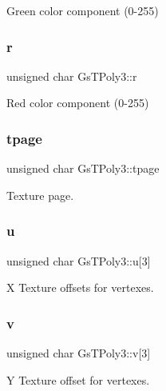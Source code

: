 Green color component (0-\/255) 

\mbox{\label{structGsTPoly3_a377534efc910699a7515c773ce93ba3e}} 
\subsubsection{\texorpdfstring{r}{r}}
{\footnotesize\ttfamily unsigned char Gs\+T\+Poly3\+::r}



Red color component (0-\/255) 

\mbox{\label{structGsTPoly3_a12e862df67b142de177d776c29272e67}} 
\subsubsection{\texorpdfstring{tpage}{tpage}}
{\footnotesize\ttfamily unsigned char Gs\+T\+Poly3\+::tpage}



Texture page. 

\mbox{\label{structGsTPoly3_abe4334142f3a9953479fd82cc9962c27}} 
\subsubsection{\texorpdfstring{u}{u}}
{\footnotesize\ttfamily unsigned char Gs\+T\+Poly3\+::u\mbox{[}3\mbox{]}}



X Texture offsets for vertexes. 

\mbox{\label{structGsTPoly3_a0542f91621ad1a3ad58c57529edbc9ae}} 
\subsubsection{\texorpdfstring{v}{v}}
{\footnotesize\ttfamily unsigned char Gs\+T\+Poly3\+::v\mbox{[}3\mbox{]}}



Y Texture offset for vertexes. 

